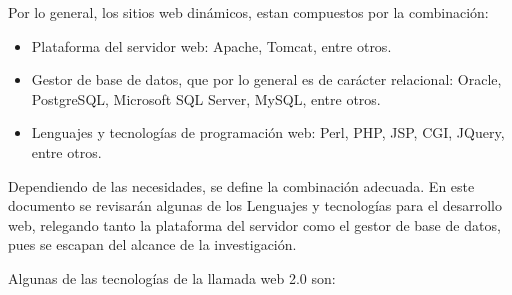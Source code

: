 Por lo general, los sitios web dinámicos, estan compuestos por la combinación:
\begin{itemize}
 \item Plataforma del servidor web: Apache, Tomcat, entre otros.
 \item Gestor de base de datos, que por lo general es de carácter relacional: Oracle, PostgreSQL, Microsoft SQL Server, MySQL, entre otros.
 \item Lenguajes y tecnologías de programación web: Perl, PHP, JSP, CGI, JQuery, entre otros.
\end{itemize}

Dependiendo de las necesidades, se define la combinación adecuada. En este documento se revisarán algunas de los Lenguajes y
tecnologías para el desarrollo web, relegando tanto la plataforma del servidor como el gestor de base de datos, pues se escapan 
del alcance de la investigación.

Algunas de las tecnologías de la llamada web 2.0 son:

